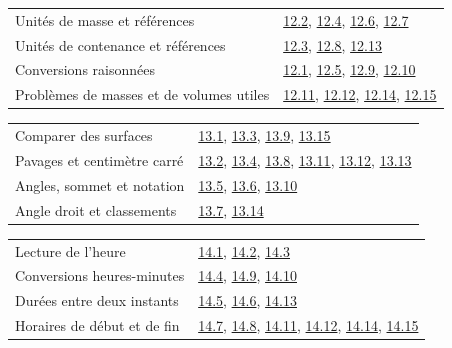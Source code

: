 \begin{tabularx}{\linewidth}{@{}Yl@{}}\toprule
Unités de masse et références & \hyperref[exo-12-2]{12.2}, \hyperref[exo-12-4]{12.4}, \hyperref[exo-12-6]{12.6}, \hyperref[exo-12-7]{12.7}\\[2mm]
Unités de contenance et références & \hyperref[exo-12-3]{12.3}, \hyperref[exo-12-8]{12.8}, \hyperref[exo-12-13]{12.13}\\[2mm]
Conversions raisonnées & \hyperref[exo-12-1]{12.1}, \hyperref[exo-12-5]{12.5}, \hyperref[exo-12-9]{12.9}, \hyperref[exo-12-10]{12.10}\\[2mm]
Problèmes de masses et de volumes utiles & \hyperref[exo-12-11]{12.11}, \hyperref[exo-12-12]{12.12}, \hyperref[exo-12-14]{12.14}, \hyperref[exo-12-15]{12.15}\\[2mm]
\bottomrule\end{tabularx}\par\vspace{4mm}
\clearpage
{}\fontsize{10}{13}\selectfont
{}\begin{tabularx}{\linewidth}{@{}Yl@{}}\toprule
Comparer des surfaces & \hyperref[exo-13-1]{13.1}, \hyperref[exo-13-3]{13.3}, \hyperref[exo-13-9]{13.9}, \hyperref[exo-13-15]{13.15}\\[2mm]
Pavages et centimètre carré & \hyperref[exo-13-2]{13.2}, \hyperref[exo-13-4]{13.4}, \hyperref[exo-13-8]{13.8}, \hyperref[exo-13-11]{13.11}, \hyperref[exo-13-12]{13.12}, \hyperref[exo-13-13]{13.13}\\[2mm]
Angles, sommet et notation & \hyperref[exo-13-5]{13.5}, \hyperref[exo-13-6]{13.6}, \hyperref[exo-13-10]{13.10}\\[2mm]
Angle droit et classements & \hyperref[exo-13-7]{13.7}, \hyperref[exo-13-14]{13.14}\\[2mm]
\bottomrule\end{tabularx}\par\vspace{4mm}
\begin{tabularx}{\linewidth}{@{}Yl@{}}\toprule
Lecture de l’heure & \hyperref[exo-14-1]{14.1}, \hyperref[exo-14-2]{14.2}, \hyperref[exo-14-3]{14.3}\\[2mm]
Conversions heures-minutes & \hyperref[exo-14-4]{14.4}, \hyperref[exo-14-9]{14.9}, \hyperref[exo-14-10]{14.10}\\[2mm]
Durées entre deux instants & \hyperref[exo-14-5]{14.5}, \hyperref[exo-14-6]{14.6}, \hyperref[exo-14-13]{14.13}\\[2mm]
Horaires de début et de fin & \hyperref[exo-14-7]{14.7}, \hyperref[exo-14-8]{14.8}, \hyperref[exo-14-11]{14.11}, \hyperref[exo-14-12]{14.12}, \hyperref[exo-14-14]{14.14}, \hyperref[exo-14-15]{14.15}\\[2mm]
\bottomrule\end{tabularx}\par\vspace{4mm}
